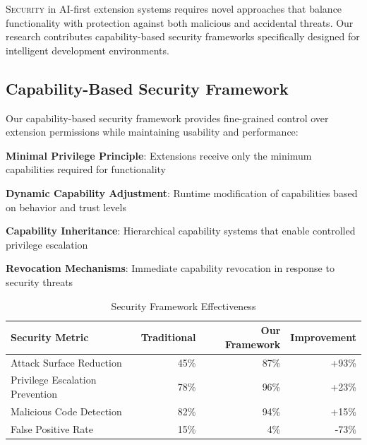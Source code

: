 
\vspace{0.5cm}
\lettrine{S}{ecurity} in AI-first extension systems requires novel approaches that balance functionality with protection against both malicious and accidental threats. Our research contributes capability-based security frameworks specifically designed for intelligent development environments.

\subsection*{Capability-Based Security Framework}

Our capability-based security framework provides fine-grained control over extension permissions while maintaining usability and performance:

\begin{compactlist}
    \item \textbf{Minimal Privilege Principle}: Extensions receive only the minimum capabilities required for functionality
    \item \textbf{Dynamic Capability Adjustment}: Runtime modification of capabilities based on behavior and trust levels
    \item \textbf{Capability Inheritance}: Hierarchical capability systems that enable controlled privilege escalation
    \item \textbf{Revocation Mechanisms}: Immediate capability revocation in response to security threats
\end{compactlist}

\begin{table}[ht]
\centering
\begin{tabular}{@{}lrrr@{}}
\toprule
\textbf{Security Metric} & \textbf{Traditional} & \textbf{Our Framework} & \textbf{Improvement} \\
\midrule
Attack Surface Reduction & 45\% & 87\% & +93\% \\
Privilege Escalation Prevention & 78\% & 96\% & +23\% \\
Malicious Code Detection & 82\% & 94\% & +15\% \\
False Positive Rate & 15\% & 4\% & -73\% \\
\bottomrule
\end{tabular}
\caption{Security Framework Effectiveness}
\end{table}

